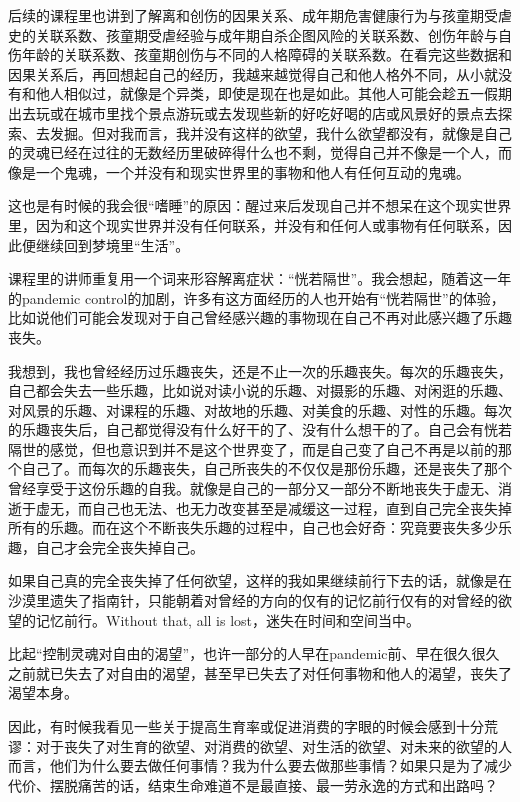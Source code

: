 后续的课程里也讲到了解离和创伤的因果关系、成年期危害健康行为与孩童期受虐史的关联系数、孩童期受虐经验与成年期自杀企图风险的关联系数、创伤年龄与自伤年龄的关联系数、孩童期创伤与不同的人格障碍的关联系数。在看完这些数据和因果关系后，再回想起自己的经历，我越来越觉得自己和他人格外不同，从小就没有和他人相似过，就像是个异类，即使是现在也是如此。其他人可能会趁五一假期出去玩或在城市里找个景点游玩或去发现些新的好吃好喝的店或风景好的景点去探索、去发掘。但对我而言，我并没有这样的欲望，我什么欲望都没有，就像是自己的灵魂已经在过往的无数经历里破碎得什么也不剩，觉得自己并不像是一个人，而像是一个鬼魂，一个并没有和现实世界里的事物和他人有任何互动的鬼魂。

这也是有时候的我会很“嗜睡”的原因：醒过来后发现自己并不想呆在这个现实世界里，因为和这个现实世界并没有任何联系，并没有和任何人或事物有任何联系，因此便继续回到梦境里“生活”。

课程里的讲师重复用一个词来形容解离症状：“恍若隔世”。我会想起，随着这一年的pandemic control的加剧，许多有这方面经历的人也开始有“恍若隔世”的体验，比如说他们可能会发现对于自己曾经感兴趣的事物现在自己不再对此感兴趣了\pozhehao{}乐趣丧失。

我想到，我也曾经经历过乐趣丧失，还是不止一次的乐趣丧失。每次的乐趣丧失，自己都会失去一些乐趣，比如说对读小说的乐趣、对摄影的乐趣、对闲逛的乐趣、对风景的乐趣、对课程的乐趣、对故地的乐趣、对美食的乐趣、对性的乐趣。每次的乐趣丧失后，自己都觉得没有什么好干的了、没有什么想干的了。自己会有恍若隔世的感觉，但也意识到并不是这个世界变了，而是自己变了\pozhehao{}自己不再是以前的那个自己了。而每次的乐趣丧失，自己所丧失的不仅仅是那份乐趣，还是丧失了那个曾经享受于这份乐趣的自我。就像是自己的一部分又一部分不断地丧失于虚无、消逝于虚无，而自己也无法、也无力改变甚至是减缓这一过程，直到自己完全丧失掉所有的乐趣。而在这个不断丧失乐趣的过程中，自己也会好奇：究竟要丧失多少乐趣，自己才会完全丧失掉自己。

如果自己真的完全丧失掉了任何欲望，这样的我如果继续前行下去的话，就像是在沙漠里遗失了指南针，只能朝着对曾经的方向的仅有的记忆前行\pozhehao{}仅有的对曾经的欲望的记忆前行。Without that, all is lost，迷失在时间和空间当中。

比起“控制灵魂对自由的渴望”，也许一部分的人早在pandemic前、早在很久很久之前就已失去了对自由的渴望，甚至早已失去了对任何事物和他人的渴望，丧失了渴望本身。

因此，有时候我看见一些关于提高生育率或促进消费的字眼的时候会感到十分荒谬：对于丧失了对生育的欲望、对消费的欲望、对生活的欲望、对未来的欲望的人而言，他们为什么要去做任何事情？我为什么要去做那些事情？如果只是为了减少代价、摆脱痛苦的话，结束生命难道不是最直接、最一劳永逸的方式和出路吗？

